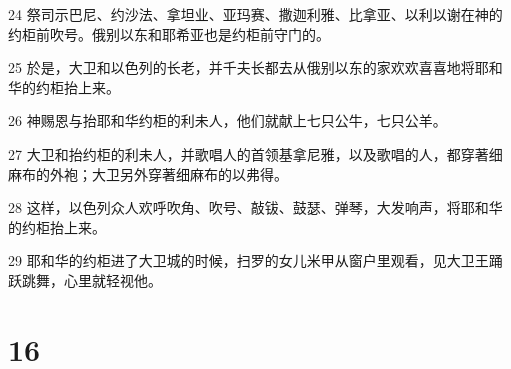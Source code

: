 \par 24 祭司示巴尼、约沙法、拿坦业、亚玛赛、撒迦利雅、比拿亚、以利以谢在神的约柜前吹号。俄别以东和耶希亚也是约柜前守门的。
\par 25 於是，大卫和以色列的长老，并千夫长都去从俄别以东的家欢欢喜喜地将耶和华的约柜抬上来。
\par 26 神赐恩与抬耶和华约柜的利未人，他们就献上七只公牛，七只公羊。
\par 27 大卫和抬约柜的利未人，并歌唱人的首领基拿尼雅，以及歌唱的人，都穿著细麻布的外袍；大卫另外穿著细麻布的以弗得。
\par 28 这样，以色列众人欢呼吹角、吹号、敲钹、鼓瑟、弹琴，大发响声，将耶和华的约柜抬上来。
\par 29 耶和华的约柜进了大卫城的时候，扫罗的女儿米甲从窗户里观看，见大卫王踊跃跳舞，心里就轻视他。

\chapter{16}

